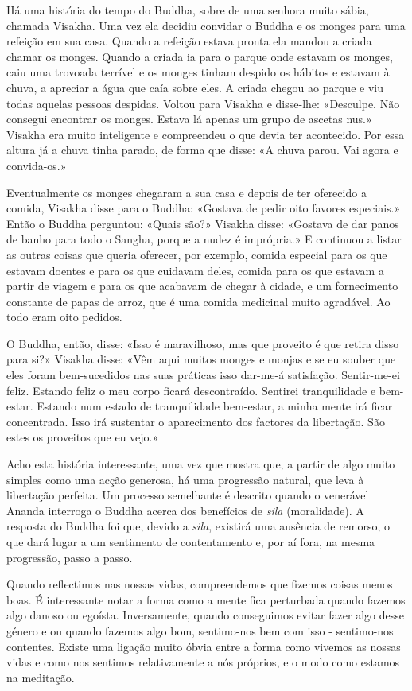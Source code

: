 Há uma história do tempo do Buddha, sobre de uma senhora muito sábia,
chamada Visakha. Uma vez ela decidiu convidar o Buddha e os monges para
uma refeição em sua casa. Quando a refeição estava pronta ela mandou a
criada chamar os monges. Quando a criada ia para o parque onde estavam
os monges, caiu uma trovoada terrível e os monges tinham despido os
hábitos e estavam à chuva, a apreciar a água que caía sobre eles. A
criada chegou ao parque e viu todas aquelas pessoas despidas. Voltou
para Visakha e disse-lhe: «Desculpe. Não consegui encontrar os monges.
Estava lá apenas um grupo de ascetas nus.» Visakha era muito inteligente
e compreendeu o que devia ter acontecido. Por essa altura já a chuva
tinha parado, de forma que disse: «A chuva parou. Vai agora e
convida-os.»

Eventualmente os monges chegaram a sua casa e depois de ter oferecido a
comida, Visakha disse para o Buddha: «Gostava de pedir oito favores
especiais.» Então o Buddha perguntou: «Quais são?» Visakha disse:
«Gostava de dar panos de banho para todo o Sangha, porque a nudez é
imprópria.» E continuou a listar as outras coisas que queria oferecer,
por exemplo, comida especial para os que estavam doentes e para os que
cuidavam deles, comida para os que estavam a partir de viagem e para os
que acabavam de chegar à cidade, e um fornecimento constante de papas de
arroz, que é uma comida medicinal muito agradável. Ao todo eram oito
pedidos.

O Buddha, então, disse: «Isso é maravilhoso, mas que proveito é que
retira disso para si?» Visakha disse: «Vêm aqui muitos monges e monjas e
se eu souber que eles foram bem-sucedidos nas suas práticas isso
dar-me-á satisfação. Sentir-me-ei feliz. Estando feliz o meu corpo
ficará descontraído. Sentirei tranquilidade e bem-estar. Estando num
estado de tranquilidade bem-estar, a minha mente irá ficar concentrada.
Isso irá sustentar o aparecimento dos factores da libertação. São estes
os proveitos que eu vejo.»

Acho esta história interessante, uma vez que mostra que, a partir de
algo muito simples como uma acção generosa, há uma progressão natural,
que leva à libertação perfeita. Um processo semelhante é descrito quando
o venerável Ananda interroga o Buddha acerca dos benefícios de
\emph{sila} (moralidade). A resposta do Buddha foi que, devido a
\emph{sila}, existirá uma ausência de remorso, o que dará lugar a um
sentimento de contentamento e, por aí fora, na mesma progressão, passo a
passo.

Quando reflectimos nas nossas vidas, compreendemos que fizemos coisas
menos boas. É interessante notar a forma como a mente fica perturbada
quando fazemos algo danoso ou egoísta. Inversamente, quando conseguimos
evitar fazer algo desse género e ou quando fazemos algo bom, sentimo-nos
bem com isso - sentimo-nos contentes. Existe uma ligação muito óbvia
entre a forma como vivemos as nossas vidas e como nos sentimos
relativamente a nós próprios, e o modo como estamos na meditação.

